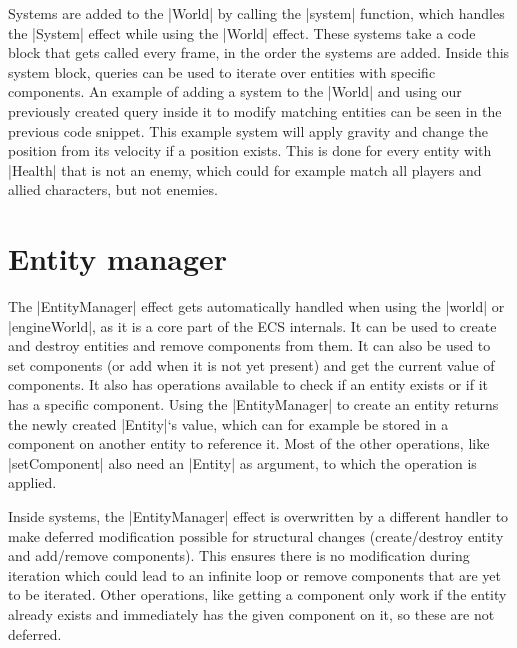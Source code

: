 Systems are added to the |World| by calling the |system| function, which handles the |System| effect while using the |World| effect. These systems take a code block that gets called every frame, in the order the systems are added. Inside this system block, queries can be used to iterate over entities with specific components. An example of adding a system to the |World| and using our previously created query inside it to modify matching entities can be seen in the previous code snippet. This example system will apply gravity and change the position from its velocity if a position exists. This is done for every entity with |Health| that is not an enemy, which could for example match all players and allied characters, but not enemies.

\section{Entity manager}

The |EntityManager| effect gets automatically handled when using the |world| or |engineWorld|, as it is a core part of the ECS internals. It can be used to create and destroy entities and remove components from them. It can also be used to set components (or add when it is not yet present) and get the current value of components. It also has operations available to check if an entity exists or if it has a specific component. Using the |EntityManager| to create an entity returns the newly created |Entity|`s value, which can for example be stored in a component on another entity to reference it. Most of the other operations, like |setComponent| also need an |Entity| as argument, to which the operation is applied.

Inside systems, the |EntityManager| effect is overwritten by a different handler to make deferred modification possible for structural changes (create/destroy entity and add/remove components). This ensures there is no modification during iteration which could lead to an infinite loop or remove components that are yet to be iterated. Other operations, like getting a component only work if the entity already exists and immediately has the given component on it, so these are not deferred.
